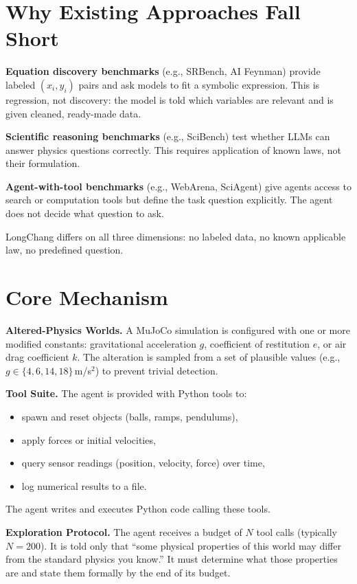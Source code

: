 \documentclass[10pt,twocolumn]{article}
\begin{document}
\section{Why Existing Approaches Fall Short}

\textbf{Equation discovery benchmarks} (e.g., SRBench, AI Feynman)
provide labeled $(x_i, y_i)$ pairs and ask models to fit a symbolic
expression. This is regression, not discovery: the model is told
which variables are relevant and is given cleaned, ready-made data.

\textbf{Scientific reasoning benchmarks} (e.g., SciBench) test
whether LLMs can answer physics questions correctly. This requires
application of known laws, not their formulation.

\textbf{Agent-with-tool benchmarks} (e.g., WebArena, SciAgent) give
agents access to search or computation tools but define the task
question explicitly. The agent does not decide what question to ask.

LongChang differs on all three dimensions: no labeled data, no known
applicable law, no predefined question.

\section{Core Mechanism}

\textbf{Altered-Physics Worlds.} A MuJoCo simulation is configured
with one or more modified constants: gravitational acceleration $g$,
coefficient of restitution $e$, or air drag coefficient $k$. The
alteration is sampled from a set of plausible values (e.g.,
$g \in \{4, 6, 14, 18\}$\,m/s$^2$) to prevent trivial detection.

\textbf{Tool Suite.} The agent is provided with Python tools to:
\begin{itemize}[itemsep=1pt,parsep=0pt]
  \item spawn and reset objects (balls, ramps, pendulums),
  \item apply forces or initial velocities,
  \item query sensor readings (position, velocity, force) over time,
  \item log numerical results to a file.
\end{itemize}
The agent writes and executes Python code calling these tools.

\textbf{Exploration Protocol.} The agent receives a budget of $N$
tool calls (typically $N = 200$). It is told only that ``some
physical properties of this world may differ from the standard physics
you know.'' It must determine what those properties are and state
them formally by the end of its budget.
\end{document}
